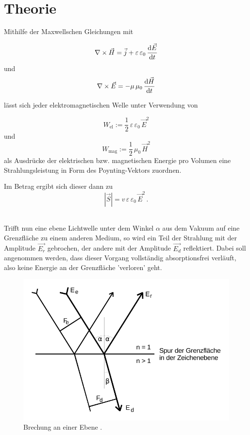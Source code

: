 \section{Theorie}
\label{sec:Theorie}

Mithilfe der Maxwellschen Gleichungen mit

\begin{equation*}
    \label{eq:maxwell4}
    \nabla \times \vec{H} = \vec{j} + \varepsilon \, \varepsilon_0 \, \dfrac{\mathrm{d} \vec{E}}{\mathrm{d} t} 
\end{equation*}
und
\begin{equation*}
    \label{eq:maxwell2}
    \nabla \times \vec{E} = - \mu \, \mu_0 \, \frac{\mathrm{d} \vec{H}}{\mathrm{d} t} 
\end{equation*}

lässt sich jeder elektromagnetischen Welle unter Verwendung von

\begin{equation*}
    W_{\text{el}} := \frac{1}{2} \, \varepsilon \, \varepsilon_0 \, \vec{E}^2
\end{equation*}
und
\begin{equation*}
    W_{\text{mag}} := \frac{1}{2} \, \mu_0 \, \vec{H}^2
\end{equation*}
als Ausdrücke der elektrischen bzw. magnetischen Energie pro Volumen eine Strahlungsleistung in Form des Poynting-Vektors zuordnen. 

Im Betrag ergibt sich dieser dann zu
\begin{equation}
    \left| \vec{S} \right|  = v \, \varepsilon \, \varepsilon_0 \, \vec{E}^2 \,.
    \label{eq:betragpoynting}
\end{equation} \\

\newpage

Trifft nun eine ebene Lichtwelle unter dem Winkel $\alpha$ aus dem Vakuum auf eine Grenzfläche zu einem anderen Medium, 
so wird ein Teil der Strahlung mit der Amplitude $\vec{E_r}$ gebrochen, der andere mit der Amplitude $\vec{E_d}$ reflektiert.
Dabei soll angenommen werden, dass dieser Vorgang vollständig absorptionsfrei verläuft, also keine Energie an der Grenzfläche 'verloren' geht.
\begin{figure}[H]
    \centering
    \includegraphics{Brechung an einer Ebene.pdf}
    \caption{Brechung an einer Ebene \cite{ap01}.} 
    \label{fig:abb1}
\end{figure}

